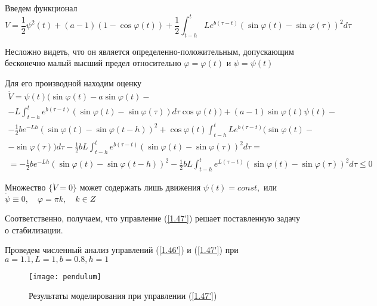Введем функционал $$V = \frac12 \psi ^ 2 (t) + (a - 1) (1 - \cos \varphi (t)) + \frac12 \int_{t-h}^{t} L e^{b (\tau - t)} (\sin \varphi(t) - \sin \varphi (\tau))^2 d \tau$$

Несложно видеть, что он является определенно-положительным, допускающим бесконечно малый высший предел относительно $\varphi = \varphi (t)$ и $\psi = \psi (t)$

Для его производной находим оценку
$$
\begin{array}{c}
\displaystyle \dot V = \psi (t) (\sin \varphi (t) - a \sin \varphi (t) -\\
\displaystyle - L \int_{t-h}^{t} e^{b (\tau - t)} (\sin \varphi (t) - \sin \varphi (\tau)) d \tau \cos \varphi (t)) + (a - 1) \sin \varphi (t) \psi (t)-\\
\displaystyle - \frac12 b e^{- L h} (\sin \varphi (t) - \sin \varphi (t - h))^2 + \cos \varphi (t) \int_{t-h}^{t} L e^{b (\tau - t)} (\sin \varphi (t)-\\
\displaystyle - \sin \varphi (\tau)) d \tau - \frac12 b L \int_{t-h}^{t} e^{b (\tau - t)} (\sin \varphi (t) - \sin \varphi (\tau))^2 d \tau =\\
\displaystyle = - \frac12 b e^{- L h} (\sin \varphi (t) - \sin \varphi (t - h))^2 - \frac12 b L \int_{t-h}^{t} e^{L (\tau - t)} (\sin \varphi (t) - \sin \varphi (\tau))^2 d \tau \le 0
\end{array}
$$

Множество $\{ \dot V = 0 \}$ может содержать лишь движения $\psi (t) = const,$ или $\dot \psi \equiv 0, \quad \varphi = \pi k, \quad k \in Z$

Соответственно, получаем, что управление (\ref{1.47'}) решает поставленную задачу о стабилизации.

Проведем численный анализ управлений (\ref{1.46'}) и (\ref{1.47'}) при $a = 1.1, L = 1, b = 0.8, h = 1$

\begin{figure}[h]
	\centering
	\texttt{[image: pendulum]}
	\caption{Результаты моделирования при управлении (\ref{1.47'})}
	\label{fig:pendulum_1}
\end{figure}
